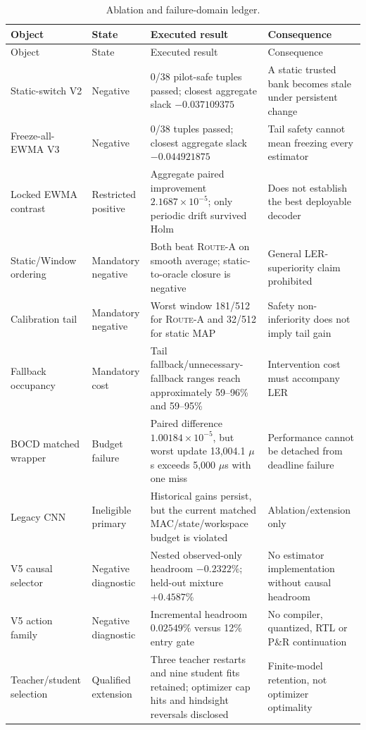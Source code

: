\documentclass[11pt]{article}
\newcommand{\RouteA}{\textsc{Route-A}}
\begin{document}
{\small
\begin{longtable}{@{}L{0.20\textwidth} L{0.17\textwidth} L{0.31\textwidth} L{0.22\textwidth}@{}}
\caption{Ablation and failure-domain ledger.}
\label{tab:supp-negative-ledger}\\
\toprule
Object & State & Executed result & Consequence \\
\midrule
\endfirsthead
\toprule
Object & State & Executed result & Consequence \\
\midrule
\endhead
Static-switch V2 & Negative & 0/38 pilot-safe tuples passed; closest aggregate slack $-0.037109375$ & A static trusted bank becomes stale under persistent change \\
Freeze-all-EWMA V3 & Negative & 0/38 tuples passed; closest aggregate slack $-0.044921875$ & Tail safety cannot mean freezing every estimator \\
Locked EWMA contrast & Restricted positive & Aggregate paired improvement $2.1687\times10^{-5}$; only periodic drift survived Holm & Does not establish the best deployable decoder \\
Static/Window ordering & Mandatory negative & Both beat \RouteA{} on smooth average; static-to-oracle closure is negative & General LER-superiority claim prohibited \\
Calibration tail & Mandatory negative & Worst window 181/512 for \RouteA{} and 32/512 for static MAP & Safety non-inferiority does not imply tail gain \\
Fallback occupancy & Mandatory cost & Tail fallback/unnecessary-fallback ranges reach approximately 59--96\% and 59--95\% & Intervention cost must accompany LER \\
BOCD matched wrapper & Budget failure & Paired difference $1.00184\times10^{-5}$, but worst update 13,004.1 $\mu$s exceeds 5,000 $\mu$s with one miss & Performance cannot be detached from deadline failure \\
Legacy CNN & Ineligible primary & Historical gains persist, but the current matched MAC/state/workspace budget is violated & Ablation/extension only \\
V5 causal selector & Negative diagnostic & Nested observed-only headroom $-0.2322\%$; held-out mixture $+0.4587\%$ & No estimator implementation without causal headroom \\
V5 action family & Negative diagnostic & Incremental headroom $0.02549\%$ versus 12\% entry gate & No compiler, quantized, RTL or P\&R continuation \\
Teacher/student selection & Qualified extension & Three teacher restarts and nine student fits retained; optimizer cap hits and hindsight reversals disclosed & Finite-model retention, not optimizer optimality \\

\end{longtable}}
\end{document}
